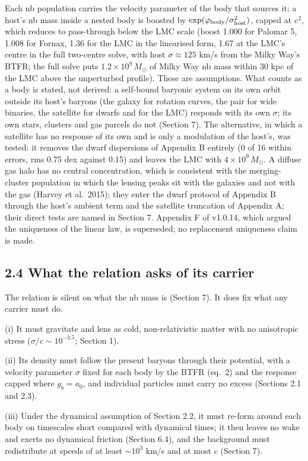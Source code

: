 \documentclass[
  10pt,
]{article}
\begin{document}
Each nb population carries the velocity parameter of the body that sources it; a host's nb mass inside a nested body is boosted by $\exp(\varphi_{\rm body}/\sigma_{\rm host}^2)$, capped at $e^2$, which reduces to pass-through below the LMC scale (boost 1.000 for Palomar 5, 1.008 for Fornax, 1.36 for the LMC in the linearised form, 1.67 at the LMC's centre in the full two-centre solve, with host $\sigma\approx125$ km/s from the Milky Way's BTFR; the full solve puts $1.2\times10^9\,M_\odot$ of Milky Way nb mass within 30 kpc of the LMC above the unperturbed profile). These are assumptions. What counts as a body is stated, not derived: a self-bound baryonic system on its own orbit outside its host's baryons (the galaxy for rotation curves, the pair for wide binaries, the satellite for dwarfs and for the LMC) responds with its own $\sigma$; its own stars, clusters and gas parcels do not (Section 7). The alternative, in which a satellite has no response of its own and is only a modulation of the host's, was tested: it removes the dwarf dispersions of Appendix B entirely (0 of 16 within errors, rms 0.75 dex against 0.15) and leaves the LMC with $4\times10^9\,M_\odot$. A diffuse gas halo has no central concentration, which is consistent with the merging-cluster population in which the lensing peaks sit with the galaxies and not with the gas (Harvey et al.~2015); they enter the dwarf protocol of Appendix B through the host's ambient term and the satellite truncation of Appendix A; their direct tests are named in Section 7. Appendix F of v1.0.14, which argued the uniqueness of the linear law, is superseded; no replacement uniqueness claim is made.

\subsection{2.4 What the relation asks of its carrier}\label{carrier}

The relation is silent on what the nb mass is (Section 7). It does fix what any carrier must do.

(i) It must gravitate and lens as cold, non-relativistic matter with no anisotropic stress ($\sigma/c\sim10^{-3.5}$; Section 1).

(ii) Its density must follow the present baryons through their potential, with a velocity parameter $\sigma$ fixed for each body by the BTFR (eq.~2) and the response capped where $g_b=a_0$, and individual particles must carry no excess (Sections 2.1 and 2.3).

(iii) Under the dynamical assumption of Section 2.2, it must re-form around each body on timescales short compared with dynamical times; it then leaves no wake and exerts no dynamical friction (Section 6.4), and the background must redistribute at speeds of at least $\sim10^3$ km/s and at most $c$ (Section 7).
\end{document}
